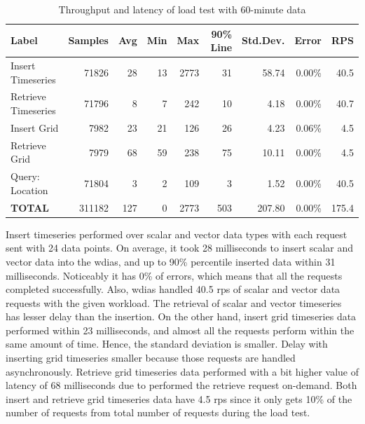 \begin{table}[ht]
\caption{Throughput and latency of load test with 60-minute data}
\footnotesize
\begin{tabulary}{\linewidth}{|L|R|R|R|R|R|R|R|R|}
\hline
\textbf{Label} & \textbf{Samples} & \textbf{Avg} & \textbf{Min} & \textbf{Max} & \textbf{90\% Line} & \textbf{Std.Dev.} & \textbf{Error} & \textbf{RPS} \\ \hline
Insert Timeseries & 71826 & 28 & 13 & 2773 & 31 & 58.74 & 0.00\% & 40.5 \\ \hline
Retrieve Timeseries & 71796 & 8 & 7 & 242 & 10 & 4.18 & 0.00\% & 40.7 \\ \hline
Insert Grid & 7982 & 23 & 21 & 126 & 26 & 4.23 & 0.06\% & 4.5 \\ \hline
Retrieve Grid & 7979 & 68 & 59 & 238 & 75 & 10.11 & 0.00\% & 4.5 \\ \hline
Query: Location & 71804 & 3 & 2 & 109 & 3 & 1.52 & 0.00\% & 40.5 \\ \hline
\textbf{TOTAL} & 311182 & 127 & 0 & 2773 & 503 & 207.80 & 0.00\% & 175.4 \\ \hline
\end{tabulary}
\label{tab:obs_all_60_min_summary}
\end{table}
Insert timeseries performed over scalar and vector data types with each request sent with 24 data points. On average, it took 28 milliseconds to insert scalar and vector data into the \acrshort{wdias}, and up to 90\% percentile inserted data within 31 milliseconds. Noticeably it has 0\% of errors, which means that all the requests completed successfully. Also, \acrshort{wdias} handled 40.5 \acrshort{rps} of scalar and vector data requests with the given workload. The retrieval of scalar and vector timeseries has lesser delay than the insertion.
On the other hand, insert grid timeseries data performed within 23 milliseconds, and almost all the requests perform within the same amount of time. Hence, the standard deviation is smaller. Delay with inserting grid timeseries smaller because those requests are handled asynchronously. Retrieve grid timeseries data performed with a bit higher value of latency of 68 milliseconds due to performed the retrieve request on-demand. Both insert and retrieve grid timeseries data have 4.5 \acrshort{rps} since it only gets 10\% of the number of requests from total number of requests during the load test.

